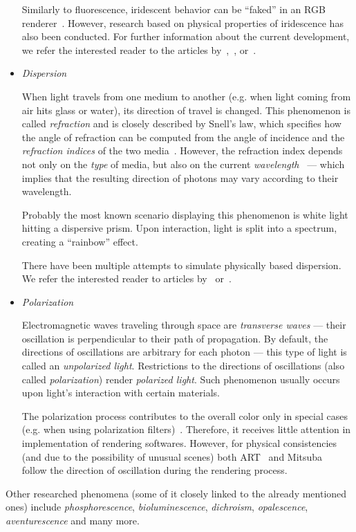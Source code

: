 \begin{itemize}
Similarly to fluorescence, iridescent behavior can be ``faked'' in an RGB renderer~\cite{iridescenceRGB}. However, research based on physical properties of iridescence has also been conducted. For further information about the current development, we refer the interested reader to the articles by~\citet{iridescenceArticle1},~\citet{iridescenceArticle2}, or~\citet{iridescenceArticle3}.

\item \emph{Dispersion}

When light travels from one medium to another (e.g. when light coming from air hits glass or water), its direction of travel is changed. This phenomenon is called \emph{refraction} and is closely described by Snell's law, which specifies how the angle of refraction can be computed from the angle of incidence and the \emph{refraction indices} of the two media~\cite{snellsLaw}. However, the refraction index depends not only on the \emph{type} of media, but also on the current \emph{wavelength}~\cite{dispersionRendering1} --- which implies that the resulting direction of photons may vary according to their wavelength.

Probably the most known scenario displaying this phenomenon is white light hitting a dispersive prism. Upon interaction, light is split into a spectrum, creating a ``rainbow'' effect.

There have been multiple attempts to simulate physically based dispersion. We refer the interested reader to articles by~\citet{dispersionRendering1} or~\citet{dispersionRendering2}.

\item \emph{Polarization}

Electromagnetic waves traveling through space are \emph{transverse waves} --- their oscillation is perpendicular to their path of propagation. By default, the directions of oscillations are arbitrary for each photon --- this type of light is called an \emph{unpolarized light}. Restrictions to the directions of oscillations (also called \emph{polarization}) render \emph{polarized light}. Such phenomenon usually occurs upon light's interaction with certain materials.

The polarization process contributes to the overall color only in special cases (e.g. when using polarization filters)~\cite{fluorescencePolarization}. Therefore, it receives little attention in implementation of rendering softwares. However, for physical consistencies (and due to the possibility of unusual scenes) both ART~\cite{ART} and Mitsuba~\cite{Mitsuba2} follow the direction of oscillation during the rendering process.
\end{itemize}

Other researched phenomena (some of it closely linked to the already mentioned ones) include \emph{phosphorescence}, \emph{bioluminescence}, \emph{dichroism}, \emph{opalescence}, \emph{aventurescence} and many more.

